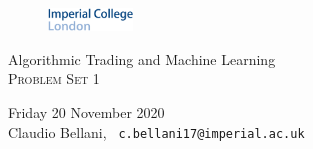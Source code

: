 \documentclass[10pt,a4paper]{article}
\date{Friday 20 November 2020}
\begin{document}
	
	\begin{center}
		\begin{figure}
			\includegraphics[width=0.2\textwidth]{imperial_logo_light}
		\end{figure}
	\begin{Large}
		Algorithmic Trading and Machine Learning \\
		\textsc{Problem Set 1}
	\end{Large}
	\end{center}

\vspace{0.2cm}

\noindent Friday 20 November 2020 \\
\noindent Claudio Bellani, \small{\texttt{ c.bellani17@imperial.ac.uk}}

\vspace{0.5cm}
\end{document}
